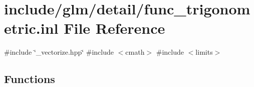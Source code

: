\hypertarget{func__trigonometric_8inl}{}\section{include/glm/detail/func\+\_\+trigonometric.inl File Reference}
\label{func__trigonometric_8inl}
{\ttfamily \#include \char`\"{}\+\_\+vectorize.\+hpp\char`\"{}}\newline
{\ttfamily \#include $<$cmath$>$}\newline
{\ttfamily \#include $<$limits$>$}\newline
\subsection*{Functions}
